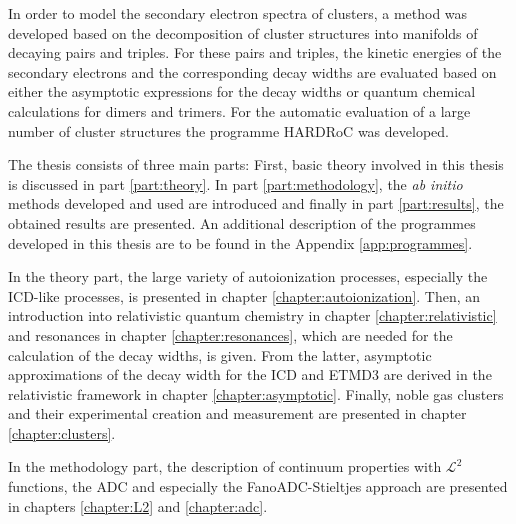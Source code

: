 In order to model the secondary electron spectra of clusters, a method
was developed based on the decomposition of cluster structures into manifolds
of decaying pairs and triples. For these pairs and triples, the kinetic energies
of the secondary electrons and the corresponding decay widths are evaluated based
on either the asymptotic expressions for the decay widths or quantum chemical
calculations for dimers and trimers. For the automatic evaluation of
a large number of cluster structures the programme
\ac{HARDRoC} \cite{HARDRoC} was developed.

The thesis consists of three main parts:
First, basic theory involved in this thesis is discussed in part
\ref{part:theory}. In part \ref{part:methodology}, the
\emph{ab initio} methods developed and used are introduced and
finally in part \ref{part:results}, the obtained results are presented.
An additional description of the programmes developed in this thesis are to
be found in the Appendix \ref{app:programmes}.

In the theory part, the large variety of autoionization processes,
especially the \ac{ICD}-like processes, is presented in chapter
\ref{chapter:autoionization}. Then, an introduction
into relativistic quantum chemistry in chapter \ref{chapter:relativistic}
and resonances in chapter \ref{chapter:resonances}, which are needed for
the calculation of the decay widths, is given. From the latter, asymptotic
approximations of the decay width for the \ac{ICD} and ETMD3 are derived
in the relativistic framework in chapter \ref{chapter:asymptotic}.
Finally, noble gas clusters and their experimental creation and measurement
are presented in chapter \ref{chapter:clusters}.

In the methodology part, the description of continuum
properties with $\mathcal{L}^2$
functions, the \ac{ADC} and especially the FanoADC-Stieltjes approach are
presented in chapters \ref{chapter:L2} and \ref{chapter:adc}.

